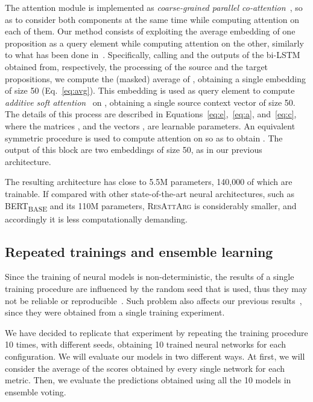 \documentclass[journal]{IEEEtran}
\begin{document}
The attention module is implemented as \emph{coarse-grained parallel co-attention}~\cite{attention-survey}, so as to consider both components at the same time while computing attention on each of them.
Our method consists of exploiting the average embedding of one proposition as a query element while computing attention on the other, similarly to what has been done in~\cite{interactive-attention-network}. Specifically, calling  and  the outputs of the bi-LSTM obtained from, respectively, the processing of the source and the target propositions, we compute the (masked) average of , obtaining a single embedding  of size 50 (Eq.~\ref{eq:avg}). This embedding is used as query element to compute \emph{additive soft attention}~\cite{attention-survey} on , obtaining a single source context vector  of size 50. The details of this process are described in Equations~\ref{eq:e},~\ref{eq:a}, and~\ref{eq:c}, where the matrices ,  and the vectors ,  are learnable parameters.
An equivalent symmetric procedure is used to compute attention on  so as to obtain . The output of this block are two embeddings of size 50, as in our previous architecture.







The resulting architecture has close to 5.5M parameters,  140,000 of which are trainable.
If compared with other state-of-the-art neural architectures, such as BERT\textsubscript{BASE} and its 110M parameters, \textsc{ResAttArg} is considerably smaller, and accordingly it is less computationally demanding.

\subsection{Repeated trainings and ensemble learning}
Since the training of neural models is non-deterministic, the results of a single training procedure are influenced by the random seed that is used, thus they may not be reliable or reproducible~\cite{Goodfellow-et-al-2016,reimers2017reporting}. Such problem also affects our previous results~\cite{W18-5201}, since they were obtained from a single training experiment.

We have decided to replicate that experiment by repeating the training procedure 10 times, with different seeds, obtaining 10 trained neural networks for each configuration.
We will evaluate our models in two different ways. At first, we will consider the average of the scores obtained by every single network for each metric. Then, we evaluate the predictions obtained using all the 10 models in ensemble voting.
\end{document}
